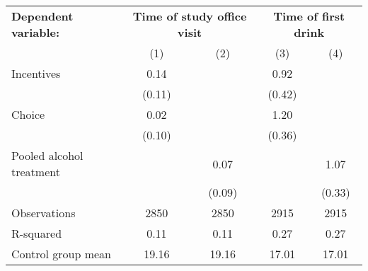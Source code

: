 \begin{tabular}{l c c c c} \toprule \textbf{Dependent variable:} & \multicolumn{2}{c}{\textbf{Time of study office visit}} & \multicolumn{2}{c}{\textbf{Time of first drink}} \\ \cmidrule(lr){2-3} \cmidrule(lr){4-5}&\multicolumn{1}{c}{(1)}&\multicolumn{1}{c}{(2)}&\multicolumn{1}{c}{(3)}&\multicolumn{1}{c}{(4)}\\
\midrule
Incentives          &        0.14&            &        0.92&            \\
                    &      (0.11)&            &      (0.42)&            \\
\addlinespace
Choice              &        0.02&            &        1.20&            \\
                    &      (0.10)&            &      (0.36)&            \\
\addlinespace
Pooled alcohol treatment&            &        0.07&            &        1.07\\
                    &            &      (0.09)&            &      (0.33)\\
\midrule
Observations        &        2850&        2850&        2915&        2915\\
R-squared           &        0.11&        0.11&        0.27&        0.27\\
Control group mean  &       19.16&       19.16&       17.01&       17.01\\
\bottomrule \end{tabular} 